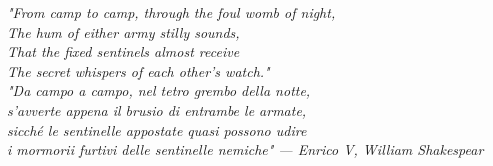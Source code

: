\documentclass[openright,titlepage,oneside,fleqn,
	headinclude,12pt,a4paper,footinclude,makeidx]{scrbook}%
\begin{document}
\frenchspacing
\raggedbottom
{}
\pagestyle{plain}



\pagestyle{scrheadings}


\tableofcontents
\listoffigures
\lstlistoflistings

\begingroup
\let\clearpage\relax
\let\cleardoublepage\relax
\let\cleardoublepage\relax

\vspace*{8ex}

\listoftables
\endgroup 

\cleardoublepage
\thispagestyle{empty}

\begin{flushright}
\null{}
\emph{"From camp to camp, through the foul womb of night,\\The hum of either army stilly sounds,\\That the fixed sentinels almost receive\\The secret whispers of each other’s watch."\\} 
\null\vspace{5mm}
\emph{"Da campo a campo, nel tetro grembo della notte,\\s’avverte appena il brusio di entrambe le armate,\\sicché le sentinelle appostate quasi possono udire\\i mormorii furtivi delle sentinelle nemiche" \break --- Enrico V, William Shakespear} \null
\end{flushright}
\cleardoublepage


%
%
%
%
%
%
%


%
%


%
%



\printindex
\end{document}
